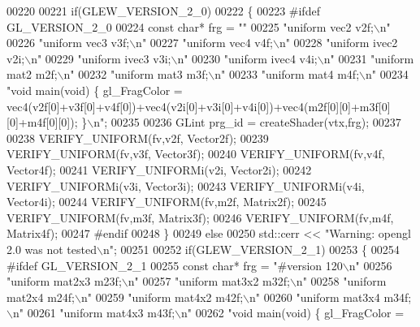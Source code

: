 \begin{DoxyCode}
00220     
00221     \textcolor{keywordflow}{if}(GLEW\_VERSION\_2\_0)
00222     \{
00223 \textcolor{preprocessor}{      #ifdef GL\_VERSION\_2\_0}
00224       \textcolor{keyword}{const} \textcolor{keywordtype}{char}* frg = \textcolor{stringliteral}{""}
00225         \textcolor{stringliteral}{"uniform vec2 v2f;\(\backslash\)n"}
00226         \textcolor{stringliteral}{"uniform vec3 v3f;\(\backslash\)n"}
00227         \textcolor{stringliteral}{"uniform vec4 v4f;\(\backslash\)n"}
00228         \textcolor{stringliteral}{"uniform ivec2 v2i;\(\backslash\)n"}
00229         \textcolor{stringliteral}{"uniform ivec3 v3i;\(\backslash\)n"}
00230         \textcolor{stringliteral}{"uniform ivec4 v4i;\(\backslash\)n"}
00231         \textcolor{stringliteral}{"uniform mat2 m2f;\(\backslash\)n"}
00232         \textcolor{stringliteral}{"uniform mat3 m3f;\(\backslash\)n"}
00233         \textcolor{stringliteral}{"uniform mat4 m4f;\(\backslash\)n"}
00234         \textcolor{stringliteral}{"void main(void) \{ gl\_FragColor =
       vec4(v2f[0]+v3f[0]+v4f[0])+vec4(v2i[0]+v3i[0]+v4i[0])+vec4(m2f[0][0]+m3f[0][0]+m4f[0][0]); \}\(\backslash\)n"};
00235         
00236       GLint prg\_id = createShader(vtx,frg);
00237       
00238       VERIFY\_UNIFORM(fv,v2f, Vector2f);
00239       VERIFY\_UNIFORM(fv,v3f, Vector3f);
00240       VERIFY\_UNIFORM(fv,v4f, Vector4f);
00241       VERIFY\_UNIFORMi(v2i, Vector2i);
00242       VERIFY\_UNIFORMi(v3i, Vector3i);
00243       VERIFY\_UNIFORMi(v4i, Vector4i);
00244       VERIFY\_UNIFORM(fv,m2f, Matrix2f);
00245       VERIFY\_UNIFORM(fv,m3f, Matrix3f);
00246       VERIFY\_UNIFORM(fv,m4f, Matrix4f);
00247 \textcolor{preprocessor}{      #endif}
00248     \}
00249     \textcolor{keywordflow}{else}
00250       std::cerr << \textcolor{stringliteral}{"Warning: opengl 2.0 was not tested\(\backslash\)n"};
00251     
00252     \textcolor{keywordflow}{if}(GLEW\_VERSION\_2\_1)
00253     \{
00254 \textcolor{preprocessor}{      #ifdef GL\_VERSION\_2\_1}
00255       \textcolor{keyword}{const} \textcolor{keywordtype}{char}* frg = \textcolor{stringliteral}{"#version 120\(\backslash\)n"}
00256         \textcolor{stringliteral}{"uniform mat2x3 m23f;\(\backslash\)n"}
00257         \textcolor{stringliteral}{"uniform mat3x2 m32f;\(\backslash\)n"}
00258         \textcolor{stringliteral}{"uniform mat2x4 m24f;\(\backslash\)n"}
00259         \textcolor{stringliteral}{"uniform mat4x2 m42f;\(\backslash\)n"}
00260         \textcolor{stringliteral}{"uniform mat3x4 m34f;\(\backslash\)n"}
00261         \textcolor{stringliteral}{"uniform mat4x3 m43f;\(\backslash\)n"}
00262         \textcolor{stringliteral}{"void main(void) \{ gl\_FragColor =
}
\end{DoxyCode}
